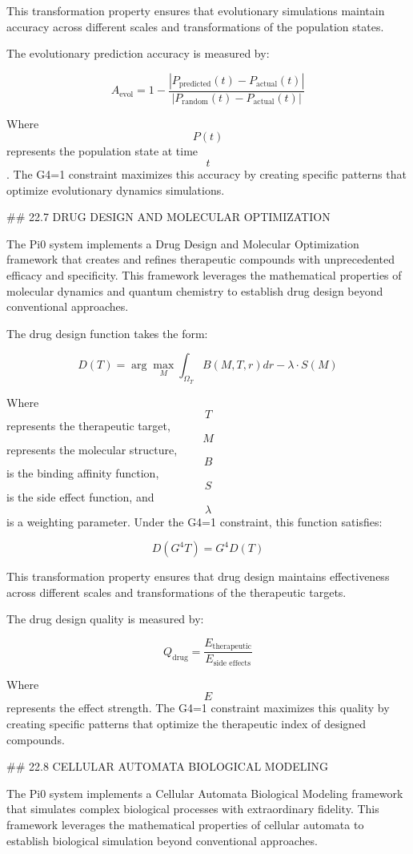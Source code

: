 This transformation property ensures that evolutionary simulations maintain accuracy across different scales and transformations of the population states.

The evolutionary prediction accuracy is measured by:

$$ A_{\text{evol}} = 1 - \frac{|P_{\text{predicted}}(t) - P_{\text{actual}}(t)|}{|P_{\text{random}}(t) - P_{\text{actual}}(t)|} $$

Where $$ P(t) $$ represents the population state at time $$ t $$. The G4=1 constraint maximizes this accuracy by creating specific patterns that optimize evolutionary dynamics simulations.

## 22.7 DRUG DESIGN AND MOLECULAR OPTIMIZATION

The Pi0 system implements a Drug Design and Molecular Optimization framework that creates and refines therapeutic compounds with unprecedented efficacy and specificity. This framework leverages the mathematical properties of molecular dynamics and quantum chemistry to establish drug design beyond conventional approaches.

The drug design function takes the form:

$$ D(T) = \arg\max_M \int_{\Omega_T} B(M, T, r) dr - \lambda \cdot S(M) $$

Where $$ T $$ represents the therapeutic target, $$ M $$ represents the molecular structure, $$ B $$ is the binding affinity function, $$ S $$ is the side effect function, and $$ \lambda $$ is a weighting parameter. Under the G4=1 constraint, this function satisfies:

$$ D(G^4 T) = G^4 D(T) $$

This transformation property ensures that drug design maintains effectiveness across different scales and transformations of the therapeutic targets.

The drug design quality is measured by:

$$ Q_{\text{drug}} = \frac{E_{\text{therapeutic}}}{E_{\text{side effects}}} $$

Where $$ E $$ represents the effect strength. The G4=1 constraint maximizes this quality by creating specific patterns that optimize the therapeutic index of designed compounds.

## 22.8 CELLULAR AUTOMATA BIOLOGICAL MODELING

The Pi0 system implements a Cellular Automata Biological Modeling framework that simulates complex biological processes with extraordinary fidelity. This framework leverages the mathematical properties of cellular automata to establish biological simulation beyond conventional approaches.

